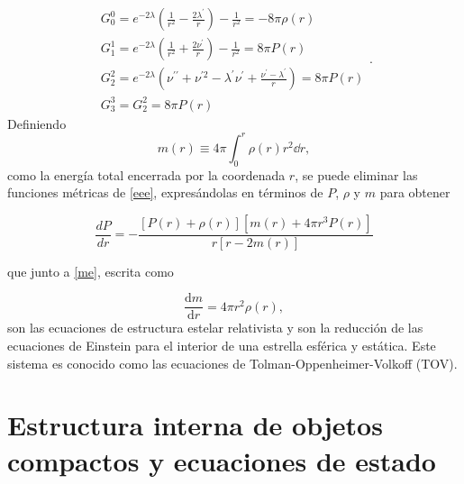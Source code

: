\begin{equation}
    \begin{array} { l } { G _ { 0 } ^ { 0 } = e ^ { - 2 \lambda } \left( \frac { 1 } { r ^ { 2 } } - \frac { 2 \lambda ^ { \prime } } { r } \right) - \frac { 1 } { r ^ { 2 } } = - 8 \pi  \rho ( r ) } \\ { G _ { 1 } ^ { 1 } = e ^ { - 2 \lambda } \left( \frac { 1 } { r ^ { 2 } } + \frac { 2 \nu ^ { \prime } } { r } \right) - \frac { 1 } { r ^ { 2 } } = 8 \pi  P ( r ) } \\ { G _ { 2 } ^ { 2 } = e ^ { - 2 \lambda } \left( \nu ^ { \prime \prime } + \nu ^ { \prime 2 } - \lambda ^ { \prime } \nu ^ { \prime } + \frac { \nu ^ { \prime } - \lambda ^ { \prime } } { r } \right) = 8 \pi  P ( r ) } \\ { G _ { 3 } ^ { 3 } = G _ { 2 } ^ { 2 } = 8 \pi  P ( r ) } \end{array}.
    \label{eee}
\end{equation}
Definiendo
\begin{equation}
    m ( r ) \equiv 4 \pi \int _ { 0 } ^ { r } \rho ( r ) r ^ { 2 } \dd r,
    \label{me}
\end{equation}
como la energía total encerrada por la coordenada $r$, se puede eliminar las funciones métricas de \eqref{eee}, expresándolas en términos de $P$, $\rho$ y $m$ para obtener 

\begin{equation}
    \frac { d P } { d r } = - \frac { [ P ( r ) + \rho ( r ) ] \left[ m ( r ) + 4 \pi r ^ { 3 } P ( r ) \right] } { r [ r - 2 m ( r ) ] }
\end{equation}

que junto a \eqref{me}, escrita como

\begin{equation}
    \frac { \mathrm { d } m } { \mathrm { d } r } = 4 \pi r ^ { 2 } \rho(r),
\end{equation}
son las ecuaciones de estructura estelar relativista y son la reducción de las ecuaciones de Einstein para el interior de una estrella esférica y estática. Este sistema es conocido como las ecuaciones de Tolman-Oppenheimer-Volkoff (TOV).

\section{Estructura interna de objetos compactos y ecuaciones de estado}

